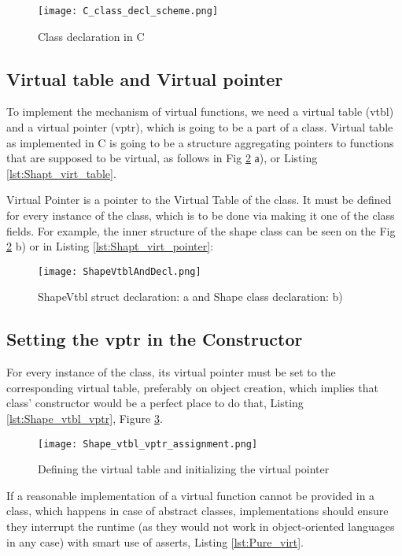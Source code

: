 \begin{figure}[h!]
    \centering
    \texttt{[image: C\_class\_decl\_scheme.png]}
    \caption{Class declaration in C}
    \label{fig:C_class_decl_scheme}
\end{figure}


\subsection{Virtual table and Virtual pointer}
To implement the mechanism of virtual functions, we need a virtual table (vtbl) and a virtual pointer (vptr), which is going to be a part of a class. Virtual table as implemented in C is going to be a structure aggregating pointers to functions that are supposed to be virtual, as follows in Fig \ref{fig:ShapeVtblAndDecl} а), or Listing \ref{lst:Shapt_virt_table}.

Virtual Pointer is a pointer to the Virtual Table of the class. It must be defined for every instance of the class, which is to be done via making it one of the class fields. For example, the inner structure of the shape class can be seen on the Fig \ref{fig:ShapeVtblAndDecl} b) or in Listing \ref{lst:Shapt_virt_pointer}:

\begin{figure}[h!]
    \centering
    \texttt{[image: ShapeVtblAndDecl.png]}
    \caption{ShapeVtbl struct declaration: a and Shape class declaration: b)}
    \label{fig:ShapeVtblAndDecl}
\end{figure}


\subsection{Setting the vptr in the Constructor}
For every instance of the class, its virtual pointer must be set to the corresponding virtual table, preferably on object creation, which implies that class’ constructor would be a perfect place to do that, Listing \ref{lst:Shape_vtbl_vptr}, Figure \ref{fig:Shape_vtbl_vptr_assignment}. 

\begin{figure}[h!]
    \centering
    \texttt{[image: Shape\_vtbl\_vptr\_assignment.png]}
    \caption{Defining the virtual table and initializing the virtual pointer}
    \label{fig:Shape_vtbl_vptr_assignment}
\end{figure}

If a reasonable implementation of a virtual function cannot be provided in a class, which happens in case of abstract classes, implementations should ensure they interrupt the runtime (as they would not work in object-oriented languages in any case) with smart use of asserts, Listing \ref{lst:Pure_virt}.

